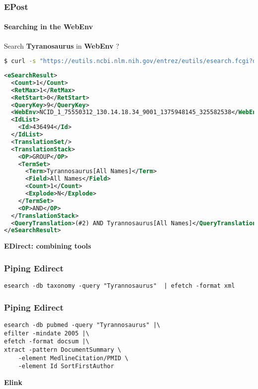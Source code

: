 \documentclass{beamer}
\newcommand{\centeredtitle}[1]{
\begin{center}
    \Huge{\bf{#1}}
\end{center}
}
\newcommand{\hugeslide}[1]{
\begin{frame}
\centeredtitle{#1}
\end{frame}
}
\begin{document}
\begin{frame}[fragile]
\frametitle{EPost}
\framesubtitle{Searching in the WebEnv}
Search {\bf Tyranosaurus} in {\bf WebEnv} ?
\begin{lstlisting}[language=bash,basicstyle=\tiny,breaklines=true,escapechar=\!]
$ curl -s "https://eutils.ncbi.nlm.nih.gov/entrez/eutils/esearch.fcgi?db=taxonomy&term=!\color{red}{Tyrannosaurus}!&usehistory=y&WebEnv=NCID_1_75550312_130.14.18.34_9001_1375948145_325582538&query_key=1"
\end{lstlisting}

\begin{lstlisting}[language=xml,basicstyle=\tiny,breaklines=true,escapechar=\%]
<eSearchResult>
  <Count>1</Count>
  <RetMax>1</RetMax>
  <RetStart>0</RetStart>
  <QueryKey>9</QueryKey>
  <WebEnv>NCID_1_75550312_130.14.18.34_9001_1375948145_325582538</WebEnv>
  <IdList>
    <Id>436494</Id>
  </IdList>
  <TranslationSet/>
  <TranslationStack>
    <OP>GROUP</OP>
    <TermSet>
      <Term>Tyrannosaurus[All Names]</Term>
      <Field>All Names</Field>
      <Count>1</Count>
      <Explode>N</Explode>
    </TermSet>
    <OP>AND</OP>
  </TranslationStack>
  <QueryTranslation>(#2) AND Tyrannosaurus[All Names]</QueryTranslation>
</eSearchResult>
\end{lstlisting}
\end{frame}
\hugeslide{EDirect: combining tools}

\begin{frame}[fragile]
\frametitle{Piping Edirect}
\begin{lstlisting}
esearch -db taxonomy -query "Tyrannosaurus"  | efetch -format xml
\end{lstlisting}
\end{frame}

\begin{frame}[fragile]
\frametitle{Piping Edirect}
\begin{lstlisting}
esearch -db pubmed -query "Tyrannosaurus" |\
efilter -mindate 2005 |\
efetch -format docsum |\
xtract -pattern DocumentSummary \
	-element MedlineCitation/PMID \
	-element Id SortFirstAuthor
\end{lstlisting}
\end{frame}


\hugeslide{Elink}
\end{document}
